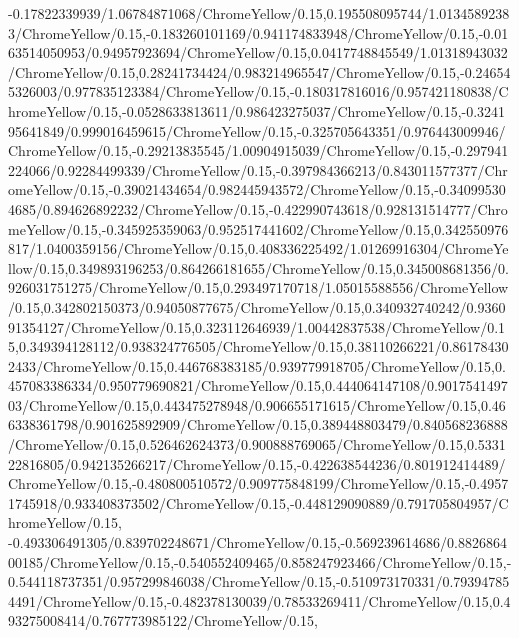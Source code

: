 {\begin{tikzternal}
{-0.17822339939/1.06784871068/ChromeYellow/0.15,0.195508095744/1.01345892383/ChromeYellow/0.15,-0.183260101169/0.941174833948/ChromeYellow/0.15,-0.0163514050953/0.94957923694/ChromeYellow/0.15,0.0417748845549/1.01318943032/ChromeYellow/0.15,0.28241734424/0.983214965547/ChromeYellow/0.15,-0.246545326003/0.977835123384/ChromeYellow/0.15,-0.180317816016/0.957421180838/ChromeYellow/0.15,-0.0528633813611/0.986423275037/ChromeYellow/0.15,-0.324195641849/0.999016459615/ChromeYellow/0.15,-0.325705643351/0.976443009946/ChromeYellow/0.15,-0.29213835545/1.00904915039/ChromeYellow/0.15,-0.297941224066/0.92284499339/ChromeYellow/0.15,-0.397984366213/0.843011577377/ChromeYellow/0.15,-0.39021434654/0.982445943572/ChromeYellow/0.15,-0.340995304685/0.894626892232/ChromeYellow/0.15,-0.422990743618/0.928131514777/ChromeYellow/0.15,-0.345925359063/0.952517441602/ChromeYellow/0.15,0.342550976817/1.0400359156/ChromeYellow/0.15,0.408336225492/1.01269916304/ChromeYellow/0.15,0.349893196253/0.864266181655/ChromeYellow/0.15,0.345008681356/0.926031751275/ChromeYellow/0.15,0.293497170718/1.05015588556/ChromeYellow/0.15,0.342802150373/0.94050877675/ChromeYellow/0.15,0.340932740242/0.936091354127/ChromeYellow/0.15,0.323112646939/1.00442837538/ChromeYellow/0.15,0.349394128112/0.938324776505/ChromeYellow/0.15,0.38110266221/0.861784302433/ChromeYellow/0.15,0.446768383185/0.939779918705/ChromeYellow/0.15,0.457083386334/0.950779690821/ChromeYellow/0.15,0.444064147108/0.901754149703/ChromeYellow/0.15,0.443475278948/0.906655171615/ChromeYellow/0.15,0.466338361798/0.901625892909/ChromeYellow/0.15,0.389448803479/0.840568236888/ChromeYellow/0.15,0.526462624373/0.900888769065/ChromeYellow/0.15,0.533122816805/0.942135266217/ChromeYellow/0.15,-0.422638544236/0.801912414489/ChromeYellow/0.15,-0.480800510572/0.909775848199/ChromeYellow/0.15,-0.49571745918/0.933408373502/ChromeYellow/0.15,-0.448129090889/0.791705804957/ChromeYellow/0.15,
-0.493306491305/0.839702248671/ChromeYellow/0.15,-0.569239614686/0.882686400185/ChromeYellow/0.15,-0.540552409465/0.858247923466/ChromeYellow/0.15,-0.544118737351/0.957299846038/ChromeYellow/0.15,-0.510973170331/0.793947854491/ChromeYellow/0.15,-0.482378130039/0.78533269411/ChromeYellow/0.15,0.493275008414/0.767773985122/ChromeYellow/0.15,
}
\end{tikzternal}}
